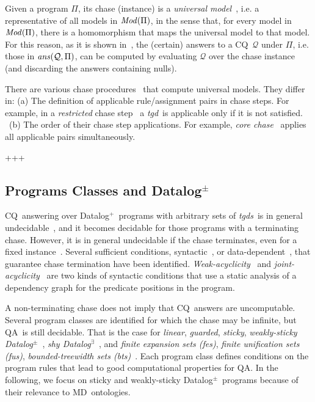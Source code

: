\documentclass[format=acmsmall, review=false, screen=true]{acmart}
\newcommand{\cq}{CQ}
\newcommand{\boxtheorem}{\ensuremath{\hfill \Box}}
\newcommand{\mc}[1]{\mathcal{ #1}}
\newcommand{\nit}[1]{{\it #1}}
\newcommand{\dpm}{{Datalog}$^\pm$}
\newcommand{\de}{{Datalog}$^\exists$}
\newcommand{\dplus}{{Datalog}$^+$}
\newcommand{\qa}{QA}
\newcommand{\md}{MD}
\newcommand{\tgds}{{\em tgds}}
\newcommand{\tgd}{{\em tgd}}
\begin{document}
{{%

Given a program $\Pi$, its chase (instance) is a \emph{universal model}~\cite{fagin}, i.e. a representative of all models in $\nit{Mod}(\Pi)$, in the sense that, for every model in $\nit{Mod}(\Pi)$, there is a homomorphism that maps the universal model to that model. For this reason, as it is shown in~\cite[Proposition 2.6]{fagin}, the (certain) answers to a \cq \ $\mc{Q}$ under $\Pi$, i.e. those in $\nit{ans}(\mc{Q}, \Pi)$, can be computed by evaluating $\mc{Q}$ over the chase instance (and discarding the answers containing nulls).

There are various chase procedures~\cite{cali13,deutsch,fagin,marnette} that compute universal models. They differ in: (a) The definition of applicable rule/assignment pairs in chase steps. For example, in a {\em restricted} chase step~\cite{cali13} a \tgd \ is applicable only if it is not satisfied. \ (b) The order of their chase step applications. For example, {\em core chase}~\cite{deutsch} applies all applicable pairs simultaneously. %

+++}

\subsection{Programs Classes and \dpm} \label{sec:pclasses}

\cq \ answering over \dplus \ programs with arbitrary sets of \tgds \ is in general undecidable~\cite{beeri-icalp}, and it becomes decidable for those programs with a terminating chase. However, it is in general undecidable if the chase terminates, even for a fixed instance~\cite{beeri-icalp,deutsch}. Several sufficient conditions, syntactic~\cite{deutsch,fagin,krotzsch,marnette}, or data-dependent~\cite{meier}, that guarantee chase termination have been identified. {\em Weak-acyclicity}~\cite{fagin} and {\em joint-acyclicity}~\cite{krotzsch} are two kinds of syntactic conditions that use a static analysis of a dependency graph for the predicate positions in the program.

A non-terminating chase does not imply that \cq \ answers are uncomputable. Several program classes are identified for which the chase may be infinite, but \qa \ is still decidable. That is the case for {\em linear}, {\em guarded}, {\em sticky}, {\em weakly-sticky \dpm}~\cite{cali09,cali10vldb,cali11sigrec,cali12is}, {\em shy \de}~\cite{leone11}, and {\em finite expansion sets (fes)}, {\em finite unification sets (fus)}, {\em bounded-treewidth sets (bts)}~\cite{baget09,baget11,baget11ai}. Each program class defines conditions on the program rules that lead to good computational properties for \qa. In the following, we focus on sticky and weakly-sticky \dpm \ programs because of their relevance to \md \ ontologies.

}
\end{document}
